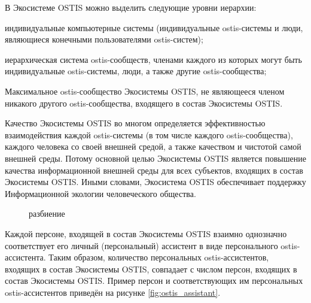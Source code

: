 В Экосистеме OSTIS можно выделить следующие уровни иерархии:
\begin{textitemize}
    \item индивидуальные компьютерные системы (индивидуальные ostis-системы и люди, являющиеся конечными пользователями ostis-систем);
    \item иерархическая система ostis-сообществ, членами каждого из которых могут быть индивидуальные ostis-системы, люди, а также другие ostis-сообщества;
    \item Максимальное ostis-сообщество Экосистемы OSTIS, не являющееся членом никакого другого ostis-сообщества, входящего в состав Экосистемы OSTIS.
\end{textitemize}

Качество Экосистемы OSTIS во многом определяется эффективностью взаимодействия каждой ostis-системы (в том числе каждого ostis-сообщества), каждого человека со своей внешней средой, а также качеством и чистотой самой внешней среды. 
Потому основной целью Экосистемы OSTIS является повышение качества информационной внешней среды для всех субъектов, входящих в состав Экосистемы OSTIS.
Иными словами, Экосистема OSTIS обеспечивает поддержку Информационной экологии человеческого общества.

\begin{figure}[htbp]
\begin{SCn}
\begin{scnrelfromset}{разбиение}
\end{scnrelfromset}
\end{SCn}
\end{figure}

Каждой персоне, входящей в состав Экосистемы OSTIS взаимно однозначно соответствует его личный (персональный) ассистент в виде персонального ostis-ассистента.
Таким образом, количество персональных ostis-ассистентов, входящих в состав Экосистемы OSTIS, совпадает с числом персон, входящих в состав Экосистемы OSTIS.
Пример персон и соответствующих им персональных ostis-ассистентов приведён на рисунке \ref{fig:ostis_assistant}.


